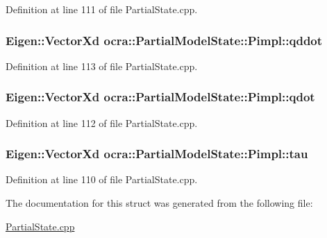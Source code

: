 Definition at line 111 of file Partial\+State.\+cpp.

\subsubsection[{\texorpdfstring{qddot}{qddot}}]{\setlength{\rightskip}{0pt plus 5cm}Eigen\+::\+Vector\+Xd ocra\+::\+Partial\+Model\+State\+::\+Pimpl\+::qddot}\hypertarget{structocra_1_1PartialModelState_1_1Pimpl_a5a7b9332901dfbde222881933efe9a0d}{}\label{structocra_1_1PartialModelState_1_1Pimpl_a5a7b9332901dfbde222881933efe9a0d}


Definition at line 113 of file Partial\+State.\+cpp.

\subsubsection[{\texorpdfstring{qdot}{qdot}}]{\setlength{\rightskip}{0pt plus 5cm}Eigen\+::\+Vector\+Xd ocra\+::\+Partial\+Model\+State\+::\+Pimpl\+::qdot}\hypertarget{structocra_1_1PartialModelState_1_1Pimpl_afaef50e83183344243397f3001f25c26}{}\label{structocra_1_1PartialModelState_1_1Pimpl_afaef50e83183344243397f3001f25c26}


Definition at line 112 of file Partial\+State.\+cpp.

\subsubsection[{\texorpdfstring{tau}{tau}}]{\setlength{\rightskip}{0pt plus 5cm}Eigen\+::\+Vector\+Xd ocra\+::\+Partial\+Model\+State\+::\+Pimpl\+::tau}\hypertarget{structocra_1_1PartialModelState_1_1Pimpl_a74798b71925f4049758733f78a6cd571}{}\label{structocra_1_1PartialModelState_1_1Pimpl_a74798b71925f4049758733f78a6cd571}


Definition at line 110 of file Partial\+State.\+cpp.



The documentation for this struct was generated from the following file\+:\begin{DoxyCompactItemize}
\item 
\hyperlink{PartialState_8cpp}{Partial\+State.\+cpp}\end{DoxyCompactItemize}
